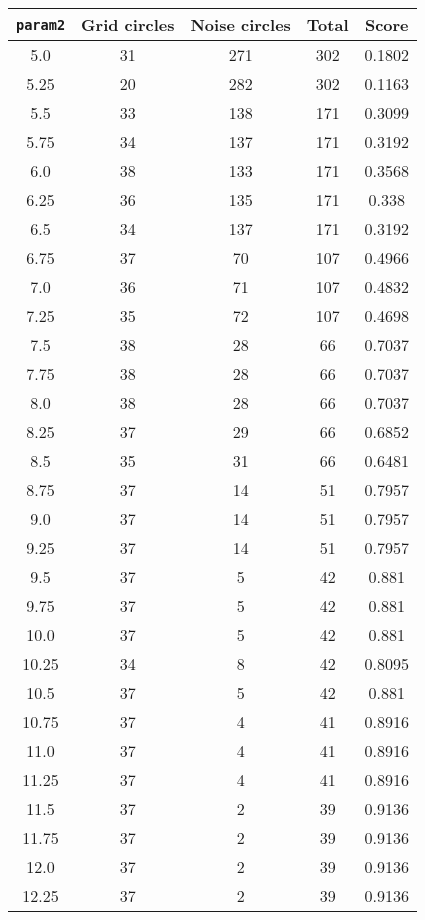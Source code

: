 \documentclass[letterpaper, 12pt]{article}
\begin{document}
\begin{longtable}{|c|c|c|c|c|}
\hline
\textbf{\texttt{param2}} & \textbf{Grid circles} & \textbf{Noise circles} & \textbf{Total} & \textbf{Score} \\
\hline
5.0 & 31 & 271 & 302 & 0.1802 \\
\hline
5.25 & 20 & 282 & 302 & 0.1163 \\
\hline
5.5 & 33 & 138 & 171 & 0.3099 \\
\hline
5.75 & 34 & 137 & 171 & 0.3192 \\
\hline
6.0 & 38 & 133 & 171 & 0.3568 \\
\hline
6.25 & 36 & 135 & 171 & 0.338 \\
\hline
6.5 & 34 & 137 & 171 & 0.3192 \\
\hline
6.75 & 37 & 70 & 107 & 0.4966 \\
\hline
7.0 & 36 & 71 & 107 & 0.4832 \\
\hline
7.25 & 35 & 72 & 107 & 0.4698 \\
\hline
7.5 & 38 & 28 & 66 & 0.7037 \\
\hline
7.75 & 38 & 28 & 66 & 0.7037 \\
\hline
8.0 & 38 & 28 & 66 & 0.7037 \\
\hline
8.25 & 37 & 29 & 66 & 0.6852 \\
\hline
8.5 & 35 & 31 & 66 & 0.6481 \\
\hline
8.75 & 37 & 14 & 51 & 0.7957 \\
\hline
9.0 & 37 & 14 & 51 & 0.7957 \\
\hline
9.25 & 37 & 14 & 51 & 0.7957 \\
\hline
9.5 & 37 & 5 & 42 & 0.881 \\
\hline
9.75 & 37 & 5 & 42 & 0.881 \\
\hline
10.0 & 37 & 5 & 42 & 0.881 \\
\hline
10.25 & 34 & 8 & 42 & 0.8095 \\
\hline
10.5 & 37 & 5 & 42 & 0.881 \\
\hline
10.75 & 37 & 4 & 41 & 0.8916 \\
\hline
11.0 & 37 & 4 & 41 & 0.8916 \\
\hline
11.25 & 37 & 4 & 41 & 0.8916 \\
\hline
11.5 & 37 & 2 & 39 & 0.9136 \\
\hline
11.75 & 37 & 2 & 39 & 0.9136 \\
\hline
12.0 & 37 & 2 & 39 & 0.9136 \\
\hline
12.25 & 37 & 2 & 39 & 0.9136 \\
\hline

\end{longtable}
\end{document}
